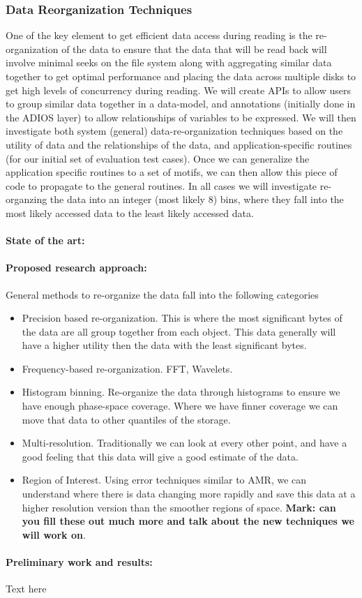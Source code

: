 \subsubsection{Data Reorganization Techniques}
One of the key element to get efficient data access during reading is the re-organization of the
data to ensure that the data that will be read back will involve minimal seeks on the file system 
along with aggregating similar data together to get optimal performance and placing the data
across multiple disks to get high levels of concurrency during reading. We will create APIs to
allow users to group similar data together in a data-model, and annotations (initially done in the
ADIOS layer) to allow relationships of variables to be expressed. We will then investigate both
system (general) data-re-organization techniques based on the utility of data and the relationships
of the data, and application-specific routines (for our initial set of evaluation test cases).  Once
we can generalize the application specific routines to a set of motifs, we can then allow this piece
of code to propagate to the general routines. In all cases we will investigate re-organzing the data
into an integer (most likely 8) bins, where they fall into the most likely accessed data to the least
likely accessed data.




\paragraph{State of the art:}
\paragraph{Proposed research approach:}
General methods to re-organize the data fall into the following categories
\begin{itemize}
\item Precision based re-organization. This is where the most significant bytes of the data are
all group together from each object. This data generally will have a higher utility then the data with
the least significant bytes.

\item Frequency-based re-organization. FFT, Wavelets.

\item Histogram binning. Re-organize the data through histograms to ensure we have enough
phase-space coverage. Where we have finner coverage we can move that data to other
quantiles of the storage. 

\item Multi-resolution. Traditionally we can look at every other point, and have a good feeling that 
this data will give a good estimate of the data.

\item Region of Interest. Using error techniques similar to AMR, we can understand where there
is data changing more rapidly and save this data at a higher resolution version than the smoother
regions of space.
{\bf Mark: can you fill these out much more and talk about the new techniques we will work on}.
\end{itemize}
\paragraph{Preliminary work and results:}
Text here
